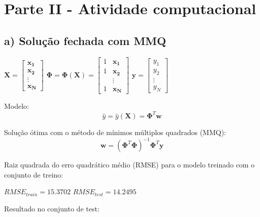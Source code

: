 \documentclass[a4paper, 12pt]{article}
\begin{document}
\newpage

\section*{Parte II - Atividade computacional}

\subsection*{a) Solução fechada com MMQ}

$
\mathbf{X} =\begin{bmatrix}
    \mathbf{x_1} \\
    \mathbf{x_2} \\
    \vdots \\
    \mathbf{x_N}
\end{bmatrix}
$
\hspace{2em}
$
\boldsymbol{\Phi} = \boldsymbol{\Phi}(\mathbf{X}) = \begin{bmatrix}
    1 & \mathbf{x_1} \\
    1 & \mathbf{x_2} \\
    &\vdots \\
    1 & \mathbf{x_N}
\end{bmatrix}
$
\hspace{2em}
$
\mathbf{y} =\begin{bmatrix}
    y_1 \\
    y_2 \\
    \vdots \\
    y_N
\end{bmatrix}
$

\vspace{1em}

Modelo:
\begin{equation}
    \hat{y} = \hat{y}(\mathbf{X}) = \boldsymbol{\Phi}^T\mathbf{w}
\end{equation}

Solução ótima com o método de mínimos múltiplos quadrados (MMQ):
\begin{equation}
    \mathbf{w} = (\boldsymbol{\Phi}^T\boldsymbol{\Phi})^{-1}\boldsymbol{\Phi}^T\mathbf{y}
\end{equation}

Raiz quadrada do erro quadrático médio (RMSE) para o modelo treinado com o conjunto de treino:

$ RMSE _{train} = 15.3702$
\hspace{2em}
$ RMSE _{test} = 14.2495$

Resultado no conjunto de test:
\end{document}
